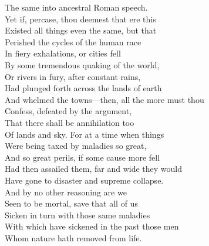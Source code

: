 The same into ancestral Roman speech.\\
Yet if, percase, thou deemest that ere this\\
Existed all things even the same, but that\\
Perished the cycles of the human race\\
In fiery exhalations, or cities fell\\
By some tremendous quaking of the world,\\
Or rivers in fury, after constant rains,\\
Had plunged forth across the lands of earth\\
And whelmed the towns—then, all the more must thou\\
Confess, defeated by the argument,\\
That there shall be annihilation too\\
Of lands and sky. For at a time when things\\
Were being taxed by maladies so great,\\
And so great perils, if some cause more fell\\
Had then assailed them, far and wide they would\\
Have gone to disaster and supreme collapse.\\
And by no other reasoning are we\\
Seen to be mortal, save that all of us\\
Sicken in turn with those same maladies\\
With which have sickened in the past those men\\
Whom nature hath removed from life.

